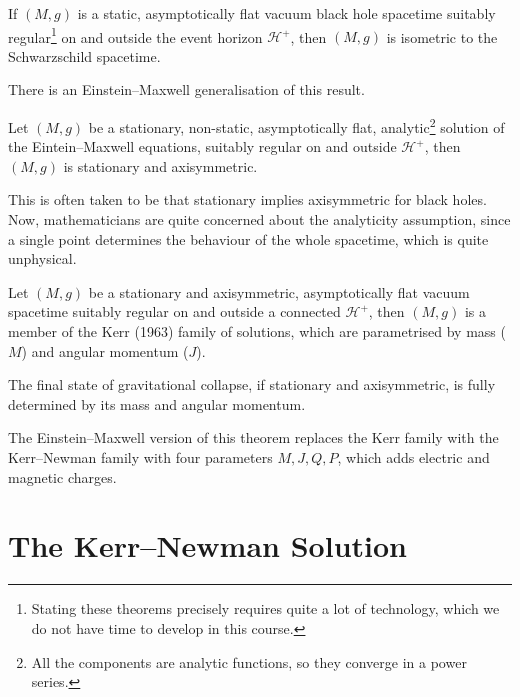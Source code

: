 \begin{theorem}
  If $(M, g)$ is a static, asymptotically flat vacuum black hole spacetime suitably regular\footnote{Stating these theorems precisely requires quite a lot of technology, which we do not have time to develop in this course.} on and outside the event horizon $\mathcal{H}^+$, then $(M, g)$ is isometric to the Schwarzschild spacetime.
\end{theorem}
\begin{leftbar}
  There is an Einstein--Maxwell generalisation of this result.
\end{leftbar}

\begin{theorem}
  Let $(M, g)$ be a stationary, non-static, asymptotically flat, analytic\footnote{All the components are analytic functions, so they converge in a power series.} solution of the Eintein--Maxwell equations, suitably regular on and outside $\mathcal{H}^+$, then $(M, g)$ is stationary and axisymmetric.
\end{theorem}
\begin{leftbar}
  This is often taken to be that stationary implies axisymmetric for black holes.
  Now, mathematicians are quite concerned about the analyticity assumption, since a single point determines the behaviour of the whole spacetime, which is quite unphysical.
\end{leftbar}

\begin{theorem}
  Let $(M, g)$ be a stationary and axisymmetric, asymptotically flat vacuum spacetime suitably regular on and outside a connected $\mathcal{H}^+$, then $(M, g)$ is a member of the Kerr (1963) family of solutions, which are parametrised by mass ($M$) and angular momentum ($J$).
\end{theorem}
\begin{leftbar}
  The final state of gravitational collapse, if stationary and axisymmetric, is fully determined by its mass and angular momentum.
\end{leftbar}

The Einstein--Maxwell version of this theorem replaces the Kerr family with the Kerr--Newman family with four parameters $M, J, Q, P$, which adds electric and magnetic charges.

\section{The Kerr--Newman Solution}%
\label{sec:the_kerr_newman_solution}

